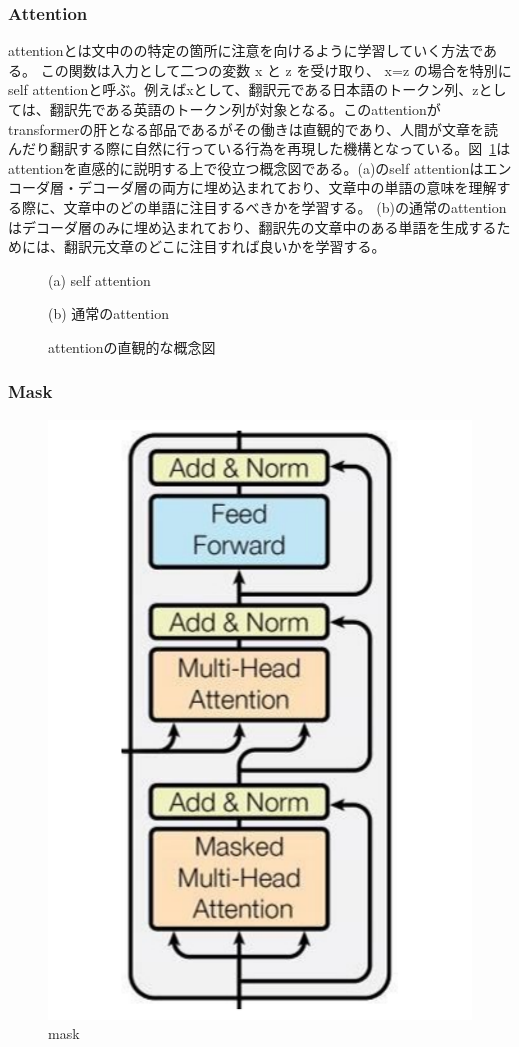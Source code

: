 \subsubsection{Attention}
attentionとは文中のの特定の箇所に注意を向けるように学習していく方法である。 この関数は入力として二つの変数 x と z を受け取り、 x=z の場合を特別にself attentionと呼ぶ。例えばxとして、翻訳元である日本語のトークン列、zとしては、翻訳先である英語のトークン列が対象となる。このattentionがtransformerの肝となる部品であるがその働きは直観的であり、人間が文章を読んだり翻訳する際に自然に行っている行為を再現した機構となっている。図~\ref{fig:att-abs}はattentionを直感的に説明する上で役立つ概念図である。(a)のself attentionはエンコーダ層・デコーダ層の両方に埋め込まれており、文章中の単語の意味を理解する際に、文章中のどの単語に注目するべきかを学習する。 (b)の通常のattentionはデコーダ層のみに埋め込まれており、翻訳先の文章中のある単語を生成するためには、翻訳元文章のどこに注目すれば良いかを学習する。


\begin{figure}
  \centering

    (a) self attention
    \vspace{5mm}

    (b) 通常のattention

  \caption{attentionの直観的な概念図}
\label{fig:att-abs}
\end{figure}

\subsubsection{Mask}

\begin{figure}
  \centering
  \includegraphics[width=0.5\linewidth]{fig/decoder.pdf}
  \caption{mask}
\label{fig:mask}
\end{figure}

